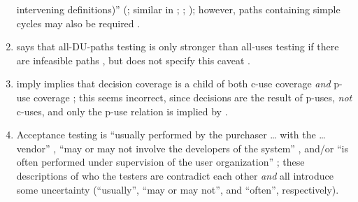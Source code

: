 \begin{enumerate}
          intervening definitions)'' (\citealp[p.~29]{IEEE2021}; similar in
          \citeyear[p.~125]{IEEE2017}; \citealp[p.~5-13]{SWEBOK2024};
          \citealp[p.~479]{PetersAndPedrycz2000}); however, paths containing
          simple cycles may also be required \citep[p.~425]{vanVliet2000}.
    \item %
           {} says that all-DU-paths testing
          is only stronger than all-uses testing if there are infeasible paths
          \citeyearpar[pp.~432-433]{vanVliet2000}, but \citeauthor{SWEBOK2024}
          does not specify this caveat \citeyearpar[p.~5-13]{SWEBOK2024}.
    \item %
           \citeauthor{PetersAndPedrycz2000} \ifnotpaper imply \else
              implies \fi that decision coverage is a child of both c-use
          coverage \emph{and} p-use coverage \citeyearpar[Fig.~12.31]{
              PetersAndPedrycz2000}; this seems incorrect, since decisions are
          the result of p-uses, \emph{not} c-uses, and only the p-use relation
          is implied by \citep[Fig.~F.1]{IEEE2021}.
    \item %
          Acceptance testing is ``usually performed by the purchaser \dots{}
          with the \dots{} vendor'' \citep[p.~5]{IEEE2017}, ``may or may not
          involve the developers of the system'' \citep[p.~4-6]{SWEBOK2014},
          and/or ``is often performed under supervision of the user
          organization'' \citep[p.~439]{vanVliet2000}; these descriptions
          of who the testers are contradict each other \emph{and} all introduce
          some uncertainty
          (``usually'', ``may or may not'', and ``often'', respectively).


\end{enumerate}
